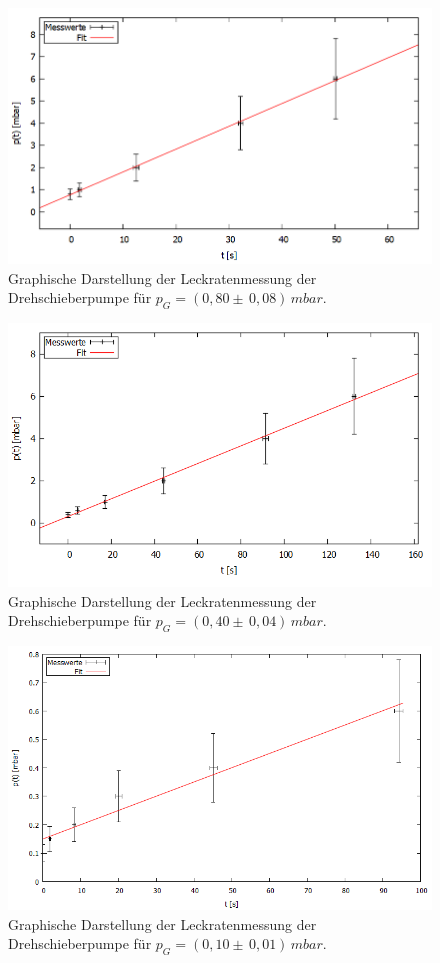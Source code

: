 \begin{figure}[H]
  \centering
  \includegraphics[width=14cm]{bilder/leckdrehfit2.png}
	\caption{Graphische Darstellung der Leckratenmessung der Drehschieberpumpe für $p_G=(0,80 \pm \, 0,08) \, \si{mbar}$.}
  \label{leckdreh2}
\end{figure}
\begin{figure}[H]
  \centering
  \includegraphics[width=14cm]{bilder/leckdrehfit3.png}
	\caption{Graphische Darstellung der Leckratenmessung der Drehschieberpumpe für $p_G=(0,40 \pm \, 0,04) \, \si{mbar}$.}
  \label{leckdreh3}
\end{figure}
\begin{figure}[H]
  \centering
  \includegraphics[width=14cm]{bilder/leckdrehfit4.png}
	\caption{Graphische Darstellung der Leckratenmessung der Drehschieberpumpe für $p_G=(0,10 \pm \, 0,01) \, \si{mbar}$.}
  \label{leckdreh4}
\end{figure}
